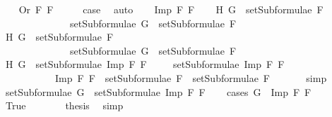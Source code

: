 \begin{isabellebody}
\isanewline
\ \ \isamarkupfalse%
\ {\isacharparenleft}Or\ F{}\ F{}{\isacharparenright}\isanewline
\ \ \isamarkupfalse%
\ \isamarkupfalse%
\ {\isacharquery}case\ \isamarkupfalse%
\ auto\isanewline
{}\isamarkupfalse%
\isanewline
\ \ \isamarkupfalse%
\ {\isacharparenleft}Imp\ F{}\ F{}{\isacharparenright}\isanewline
\ \ \isamarkupfalse%
\ H{}{\isacharcolon}\ {\isachardoublequoteopen}G\ {\isasymin}\ setSubformulae\ F{}\ {\isasymLongrightarrow}\ \isanewline
\ \ \ \ \ \ \ \ \ \ \ \ \ \ setSubformulae\ G\ {\isasymsubseteq}\ setSubformulae\ F{}{\isachardoublequoteclose}\isanewline
\ \ \isamarkupfalse%
\ H{}{\isacharcolon}\ {\isachardoublequoteopen}G\ {\isasymin}\ setSubformulae\ F{}\ {\isasymLongrightarrow}\ \isanewline
\ \ \ \ \ \ \ \ \ \ \ \ \ \ setSubformulae\ G\ {\isasymsubseteq}\ setSubformulae\ F{}{\isachardoublequoteclose}\isanewline
\ \ \isamarkupfalse%
\ H{}{\isacharcolon}\ {\isachardoublequoteopen}G\ {\isasymin}\ setSubformulae\ {\isacharparenleft}Imp\ F{}\ F{}{\isacharparenright}{\isachardoublequoteclose}\isanewline
\ \ \isamarkupfalse%
\ {}{\isacharcolon}\ {\isachardoublequoteopen}setSubformulae\ {\isacharparenleft}Imp\ F{}\ F{}{\isacharparenright}\ {\isacharequal}\ \isanewline
\ \ \ \ \ \ \ \ \ \ \ {\isacharbraceleft}Imp\ F{}\ F{}{\isacharbraceright}\ {\isasymunion}\ {\isacharparenleft}setSubformulae\ F{}\ {\isasymunion}\ setSubformulae\ F{}{\isacharparenright}{\isachardoublequoteclose}\ \isanewline
\ \ \ \ \isamarkupfalse%
\ simp\isanewline
\ \ \isamarkupfalse%
\ \isamarkupfalse%
\ {\isachardoublequoteopen}setSubformulae\ G\ {\isasymsubseteq}\ setSubformulae\ {\isacharparenleft}Imp\ F{}\ F{}{\isacharparenright}{\isachardoublequoteclose}\isanewline
\ \ \isamarkupfalse%
\ {\isacharparenleft}cases\ {\isachardoublequoteopen}G\ {\isacharequal}\ Imp\ F{}\ F{}{\isachardoublequoteclose}{\isacharparenright}\isanewline
\ \ \ \ \isamarkupfalse%
\ True\isanewline
\ \ \ \ \isamarkupfalse%
\ \isamarkupfalse%
\ {\isacharquery}thesis\ \isamarkupfalse%
\ simp\isanewline
\ \ \isamarkupfalse%

\end{isabellebody}
